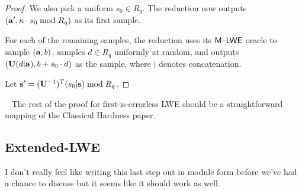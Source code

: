 \documentclass[oribibl,envcountsect,envcountsame]{llncs}
\begin{document}
\begin{proof}
We also pick a uniform $s_0 \in R_q$. The reduction now outputs $(\mathbf{a}',\kappa \cdot s_0 \bmod{R_q})$ as 
its first sample. 

For each of the remaining samples, the reduction uses its $\mathsf{M \text{\textendash} LWE}$ oracle to sample $(\mathbf{a}, b)$, 
samples $d \in R_q$ uniformly at random, and outputs $(\mathbf{U}(d|\mathbf{a}), b + s_0 \cdot d)$ as the sample, where $|$ denotes concatenation.

Let $\mathbf{s}' = (\mathbf{U}^{-1})^{T}(s_0|\mathbf{s}) \bmod{R_q}$. 


\end{proof}

~\cite{DBLP:conf/crypto/ApplebaumCPS09}
The rest of the proof for first-is-errorless LWE should be a straightforward mapping of the 
Classical Hardness paper.

\subsection{Extended-LWE}

I don't really feel like writing this last step out in module form before we've had a chance to discuss
but it seems like it should work as well. 










\end{document}
